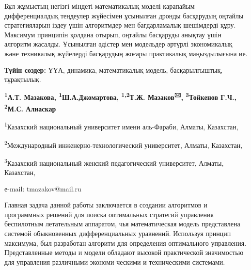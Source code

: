 Бұл жұмыстың негізгі міндеті-математикалық моделі қарапайым
дифференциалдық теңдеулер жүйесімен ұсынылған дронды басқарудың оңтайлы
стратегияларын іздеу үшін алгоритмдер мен бағдарламалық шешімдерді құру.
Максимум принципін қолдана отырып, оңтайлы басқаруды анықтау үшін
алгоритм жасалды. Ұсынылған әдістер мен модельдер әртүрлі экономикалық
және техникалық жүйелерді басқарудың жоғары практикалық маңыздылығына
ие.

{\bfseries Түйін сөздер:} ҰҰА, динамика, математикалық модель,
басқарылғыштық, тұрақтылық.


\begin{center}
{\bfseries \textsuperscript{1}А.Т. Мазакова,
\textsuperscript{1}Ш.А.Джомартова, \textsuperscript{1,2}Т.Ж.
Мазаков\textsuperscript{🖂}, \textsuperscript{3}Тойкенов Г.Ч., \textsuperscript{2}М.С. Алиаскар}

\textsuperscript{1}Казахский национальный университет имени аль-Фараби,
Алматы, Казахстан,

\textsuperscript{2}Международный инженерно-технологический университет,
Алматы, Казахстан,

\textsuperscript{3}Казахский национальный женский педагогический
университет, Алматы, Казахстан,

е-mail: tmazakov@mail.ru
\end{center}

Главная задача данной работы заключается в создании алгоритмов и
программных решений для поиска оптимальных стратегий управления
беспилотным летательным аппаратом, чья математическая модель
представлена системой обыкновенных дифференциальных уравнений. Используя
принцип максимума, был разработан алгоритм для определения оптимального
управления. Представленные методы и модели обладают высокой практической
значимостью для управления различными экономи-ческими и техническими
системами.

